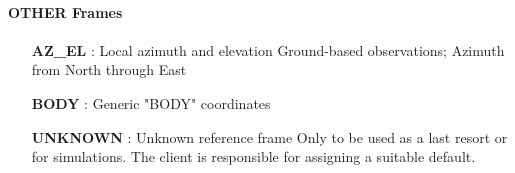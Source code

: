   \paragraph{OTHER Frames}
  \small
  \begin{itemize}
    \item[\textbf{AZ\_EL}]:  Local azimuth and elevation \newline Ground-based observations; Azimuth from North through East
    \item[\textbf{BODY}]:  Generic "BODY" coordinates
    \item[\textbf{UNKNOWN}]:  Unknown reference frame \newline Only to be used as a last resort or for simulations. The client is responsible for assigning a suitable default.
  \end{itemize}
  \normalsize
